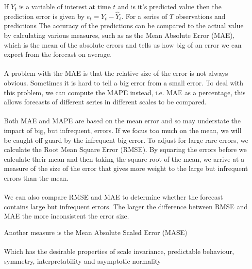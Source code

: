 If $Y_t$ is a variable of interest at time $t$ and  is it's predicted value then the prediction error is given by $e_t = Y_t - \hat{Y}_t$. For a series of $T$ observations and predictions The accuracy of the predictions can be compared to the actual value by calculating various measures, such as as the Mean Absolute Error (MAE), which is the mean of the absolute errors and tells us how big of an error we can expect from the forecast on average. \\

 \\

A problem with the MAE is that the relative size of the error is not always obvious. Sometimes it is hard to tell a big error from a small error. To deal with this problem, we can compute the MAPE instead, i.e. MAE as a percentage, this allows forecasts of different series in different scales to be compared.\\

\\

Both MAE and MAPE are based on the mean error and so may understate the impact of big, but infrequent, errors. If we focus too much on the mean, we will be caught off guard by the infrequent big error. To adjust for large rare errors, we calculate the Root Mean Square Error (RMSE). By squaring the errors before we calculate their mean and then taking the square root of the mean, we arrive at a measure of the size of the error that gives more weight to the large but infrequent errors than the mean.\\

 \\

We can also compare RMSE and MAE to determine whether the forecast contains large but infrequent errors. The larger the difference between RMSE and MAE the more inconsistent the error size.
 
Another measure is the Mean Absolute Scaled Error (MASE) \\

 \\

Which has the desirable properties of scale invariance, predictable behaviour, symmetry, interpretability and asymptotic normality
 
